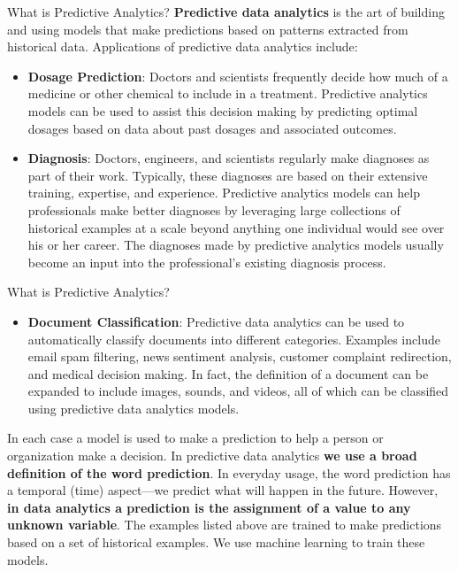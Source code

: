 \documentclass[aspectratio=169,xcolor=dvipsnames]{beamer}
\begin{document}
\begin{frame}{What is Predictive Analytics?}
\textbf{Predictive data analytics} is the art of building and using models that make predictions based on patterns extracted from historical data. Applications of predictive data analytics include:

\begin{itemize}
	\item \textbf{Dosage Prediction}: Doctors and scientists frequently decide how much of a medicine or other chemical to include in a treatment. Predictive analytics models can be used to assist this decision making by predicting optimal dosages based on data about past dosages and associated outcomes.
	
	\item \textbf{Diagnosis}: Doctors, engineers, and scientists regularly make diagnoses as part of their work. Typically, these diagnoses are based on their extensive training, expertise, and experience. Predictive analytics models can help professionals make better diagnoses by leveraging large collections of historical examples at a scale beyond anything one individual would see over his or her career. The diagnoses made by predictive analytics models usually become an input into the professional’s existing diagnosis process.

\end{itemize}
\end{frame}



\begin{frame}{What is Predictive Analytics?}
\begin{itemize}
	\item \textbf{Document Classification}: Predictive data analytics can be used to automatically classify documents into different categories. Examples include email spam filtering, news sentiment analysis, customer complaint redirection, and medical decision making. In fact, the definition of a document can be expanded to include images, sounds, and videos, all of which can be classified using predictive data analytics models.
\end{itemize}
\vspace{0.5cm}
In each case a model is used to make a prediction to help a person or organization make a decision. In predictive data analytics \textbf{we use a broad definition of the word prediction}. In everyday usage, the word prediction has a temporal (time) aspect—we predict what will happen in the future. However, \textbf{in data analytics a prediction is the assignment of a value to any unknown variable}. The examples listed above are trained to make predictions based on a set of historical examples. We use machine learning to train these models.

\end{frame}
\end{document}
